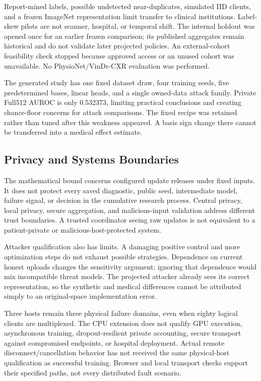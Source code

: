\documentclass[conference,letterpaper]{IEEEtran}
\begin{document}
Report-mined labels, possible undetected near-duplicates, simulated IID clients, and a frozen ImageNet representation limit transfer to clinical institutions. Label-skew pilots are not scanner, hospital, or temporal shift. The internal holdout was opened once for an earlier frozen comparison; its published aggregates remain historical and do not validate later projected policies. An external-cohort feasibility check stopped because approved access or an unused cohort was unavailable. No PhysioNet/VinDr-CXR evaluation was performed.

The generated study has one fixed dataset draw, four training seeds, five predetermined bases, linear heads, and a single owned-data attack family. Private Full512 AUROC is only 0.532373, limiting practical conclusions and creating chance-floor concerns for attack comparisons. The fixed recipe was retained rather than tuned after this weakness appeared. A basis sign change there cannot be transferred into a medical effect estimate.

\subsection{Privacy and Systems Boundaries}
The mathematical bound concerns configured update releases under fixed inputs. It does not protect every saved diagnostic, public seed, intermediate model, failure signal, or decision in the cumulative research process. Central privacy, local privacy, secure aggregation, and malicious-input validation address different trust boundaries. A trusted coordinator seeing raw updates is not equivalent to a patient-private or malicious-host-protected system.

Attacker qualification also has limits. A damaging positive control and more optimization steps do not exhaust possible strategies. Dependence on current honest uploads changes the sensitivity argument; ignoring that dependence would mix incompatible threat models. The projected attacker already sees its correct representation, so the synthetic and medical differences cannot be attributed simply to an original-space implementation error.

Three hosts remain three physical failure domains, even when eighty logical clients are multiplexed. The CPU extension does not qualify GPU execution, asynchronous training, dropout-resilient private accounting, secure transport against compromised endpoints, or hospital deployment. Actual remote disconnect/cancellation behavior has not received the same physical-host qualification as successful training. Browser and local transport checks support their specified paths, not every distributed fault scenario.
\end{document}
